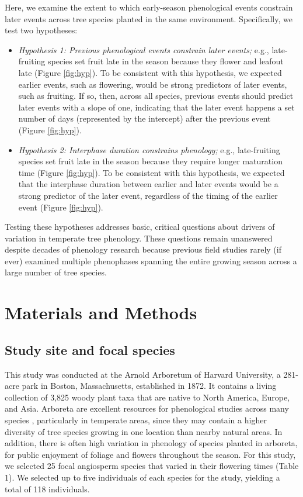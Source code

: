 \documentclass{article}
\begin{document}
\par Here, we examine the extent to which early-season phenological events constrain later events across tree species planted in the same environment. Specifically, we test two hypotheses:
\begin{itemize}
\item \textit{Hypothesis 1: Previous phenological events constrain later events;} e.g., late-fruiting species set fruit late in the season because they flower and leafout late  (Figure \ref{fig:hyp}). To be consistent with this hypothesis, we expected earlier events, such as flowering, would be strong predictors of later events, such as fruiting. If so, then, across all species, previous events should predict later events with a slope of one, indicating that the later event happens a set number of days (represented by the intercept) after the previous event (Figure \ref{fig:hyp}).
\item \textit{Hypothesis 2: Interphase duration constrains phenology;} e.g., late-fruiting species set fruit late in the season because they require longer maturation time (Figure \ref{fig:hyp}). To be consistent with this hypothesis, we expected that the interphase duration between earlier and later events would be a strong predictor of the later event, regardless of the timing  of the earlier event (Figure \ref{fig:hyp}).
\end{itemize}
Testing these hypotheses addresses basic, critical questions about drivers of variation in temperate tree phenology. These questions remain unanswered despite decades of phenology research because previous field studies rarely (if ever) examined multiple phenophases spanning the entire growing season across a large number of tree species. 
\section* {Materials and Methods}
\subsection*{Study site and focal species}
This study was conducted at the Arnold Arboretum of Harvard University, a 281-acre park in Boston, Massachusetts, established in 1872. It contains a living collection of 3,825 woody plant taxa that are native to North America, Europe, and Asia. Arboreta are excellent resources for phenological studies across many species \citep [e.g., ][]{primack2009a}, particularly in temperate areas, since they may contain a higher diversity of tree species growing in one location than nearby natural areas. In addition, there is often high variation in phenology of species planted in arboreta, for public enjoyment of foliage and flowers throughout the season. For this study, we selected 25 focal angiosperm species that varied in their flowering times (Table 1). We selected up to five individuals of each species for the study, yielding a total of 118 individuals.
\end{document}
